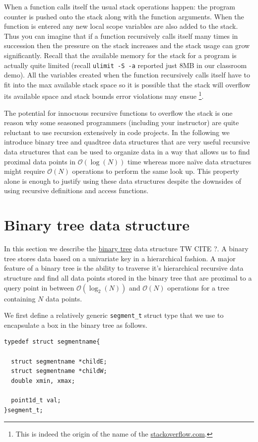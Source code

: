 When a function calls itself the usual stack operations happen: the program counter is pushed onto the stack along with the function arguments. When the function is entered any new local scope variables are also added to the stack. Thus you can imagine that if a function recursively calls itself many times in succession then the pressure on the stack increases and the stack usage can grow significantly. Recall that the available memory for the stack for a program is actually quite limited (recall \texttt{ulimit -S -a} reported just 8MB in our classroom demo). All the variables created when the function recursively calls itself have to fit into the max available stack space so it is possible that the stack will overflow its available space and stack bounds error violations may ensue \footnote{This is indeed the origin of the name of the \href{https://stackoverflow.com}{stackoverflow.com}.}. 

The potential for innocuous recursive functions to overflow the stack is one reason why some seasoned programmers (including your instructor) are quite reluctant to use recursion extensively in code projects. In the following we introduce binary tree and quadtree data structures that are very useful recursive data structures that can be used to organize data in a way that allows us to find proximal data points in $\mathcal{O}(\log(N))$ time whereas more na\"{i}ve data structures might require $\mathcal{O}(N)$ operations to perform the same look up. This property alone is enough to justify using these data structures despite the downsides of using recursive definitions and access functions.

\section{Binary tree data structure}

In this section we describe the \href{https://en.wikipedia.org/wiki/Binary_tree}{binary tree} data structure TW CITE ?. A binary tree stores data based on a univariate key in a hierarchical fashion. A major feature of a binary tree is the ability to traverse it's hierarchical recursive data structure and find all data points stored in the binary tree that are proximal to a query point in between $\mathcal{O}(\log_2(N))$ and $\mathcal{O}(N)$ operations for a tree containing $N$ data points. 

We first define a relatively generic \texttt{segment\_t} struct type that we use to encapsulate a box in the binary tree as follows.
\begin{verbatim}
typedef struct segmentname{

  struct segmentname *childE;
  struct segmentname *childW;
  double xmin, xmax;

  point1d_t val;
}segment_t;
\end{verbatim}

